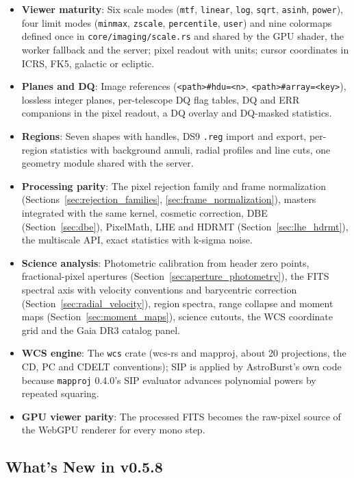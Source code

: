 \documentclass[11pt,a4paper]{article}
\newcommand{\code}[1]{\texttt{\small #1}}
\newcommand{\crate}[1]{\texttt{#1}}
\begin{document}
    \begin{itemize}[nosep]
    \item \textbf{Viewer maturity}: Six scale modes (\code{mtf}, \code{linear}, \code{log}, \code{sqrt}, \code{asinh}, \code{power}), four limit modes (\code{minmax}, \code{zscale}, \code{percentile}, \code{user}) and nine colormaps defined once in \code{core/imaging/scale.rs} and shared by the GPU shader, the worker fallback and the server; pixel readout with units; cursor coordinates in ICRS, FK5, galactic or ecliptic.
    \item \textbf{Planes and DQ}: Image references (\code{<path>\#hdu=<n>}, \code{<path>\#array=<key>}), lossless integer planes, per-telescope DQ flag tables, DQ and ERR companions in the pixel readout, a DQ overlay and DQ-masked statistics.
    \item \textbf{Regions}: Seven shapes with handles, DS9 \code{.reg} import and export, per-region statistics with background annuli, radial profiles and line cuts, one geometry module shared with the server.
    \item \textbf{Processing parity}: The pixel rejection family and frame normalization (Sections~\ref{sec:rejection_families}, \ref{sec:frame_normalization}), masters integrated with the same kernel, cosmetic correction, DBE (Section~\ref{sec:dbe}), PixelMath, LHE and HDRMT (Section~\ref{sec:lhe_hdrmt}), the multiscale API, exact statistics with k-sigma noise.
    \item \textbf{Science analysis}: Photometric calibration from header zero points, fractional-pixel apertures (Section~\ref{sec:aperture_photometry}), the FITS spectral axis with velocity conventions and barycentric correction (Section~\ref{sec:radial_velocity}), region spectra, range collapse and moment maps (Section~\ref{sec:moment_maps}), science cutouts, the WCS coordinate grid and the Gaia DR3 catalog panel.
    \item \textbf{WCS engine}: The \crate{wcs} crate (wcs-rs and mapproj, about 20 projections, the CD, PC and CDELT conventions); SIP is applied by AstroBurst's own code because \crate{mapproj} 0.4.0's SIP evaluator advances polynomial powers by repeated squaring.
    \item \textbf{GPU viewer parity}: The processed FITS becomes the raw-pixel source of the WebGPU renderer for every mono step.
    \end{itemize}

    \subsection{What's New in v0.5.8}
\end{document}
